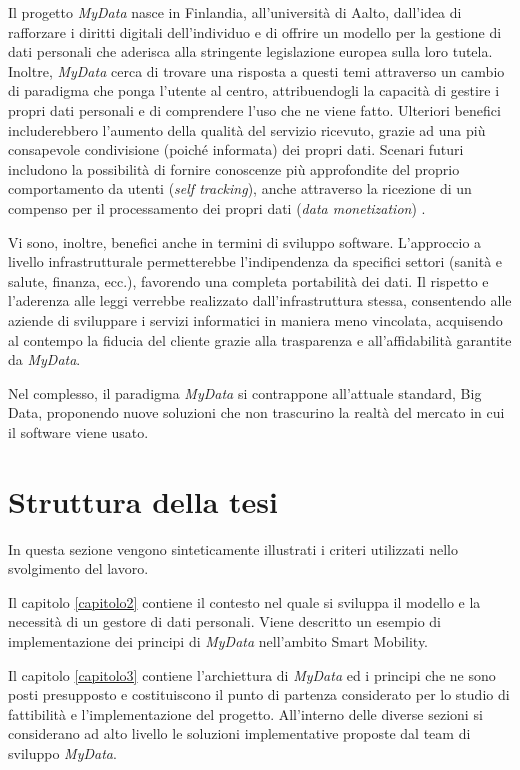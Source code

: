 Il progetto \textit{MyData} nasce in Finlandia, all’universit\`a di Aalto, dall’idea di rafforzare i diritti digitali dell’individuo e di offrire un modello per la gestione di dati personali che aderisca alla stringente legislazione europea sulla loro tutela. Inoltre, \textit{MyData} cerca di trovare una risposta a questi temi attraverso un cambio di paradigma che ponga l’utente al centro, attribuendogli la capacit\`a di gestire i propri dati personali e di comprendere l’uso che ne viene fatto. Ulteriori benefici includerebbero l’aumento della qualit\`a del servizio ricevuto, grazie ad una pi\`u consapevole condivisione (poich\'e informata) dei propri dati. Scenari futuri includono la possibilit\`a di fornire conoscenze pi\`u approfondite del proprio comportamento da utenti (\textit{self tracking}), anche attraverso la ricezione di un compenso per il processamento dei propri dati (\textit{data monetization}) \cite{mydatawhitepaper}.

Vi sono, inoltre, benefici anche in termini di sviluppo software. L’approccio a livello infrastrutturale permetterebbe l’indipendenza da specifici settori (sanit\`a e salute, finanza, ecc.), favorendo una completa portabilit\`a dei dati. Il rispetto e l’aderenza alle leggi verrebbe realizzato dall’infrastruttura stessa, consentendo alle aziende di sviluppare i servizi informatici in maniera meno vincolata, acquisendo al contempo la fiducia del cliente grazie alla trasparenza e all’affidabilit\`a garantite da \textit{MyData}.

Nel complesso, il paradigma \textit{MyData} si contrappone all’attuale standard, Big Data, proponendo nuove soluzioni che non trascurino la realt\`a del mercato in cui il software viene usato.

\section{Struttura della tesi}

In questa sezione vengono sinteticamente illustrati i criteri utilizzati nello svolgimento del lavoro.

Il capitolo \ref{capitolo2} contiene il contesto nel quale si sviluppa il modello e la necessit\`a di un gestore di dati personali. Viene descritto un esempio di implementazione dei principi di \textit{MyData} nell'ambito Smart Mobility.

Il capitolo \ref{capitolo3} contiene l'archiettura di \textit{MyData} ed i principi che ne sono posti presupposto e costituiscono il punto di partenza considerato per lo studio di fattibilit\`a e l'implementazione del progetto. All'interno delle diverse sezioni si considerano ad alto livello le soluzioni implementative proposte dal team di sviluppo \textit{MyData}.

